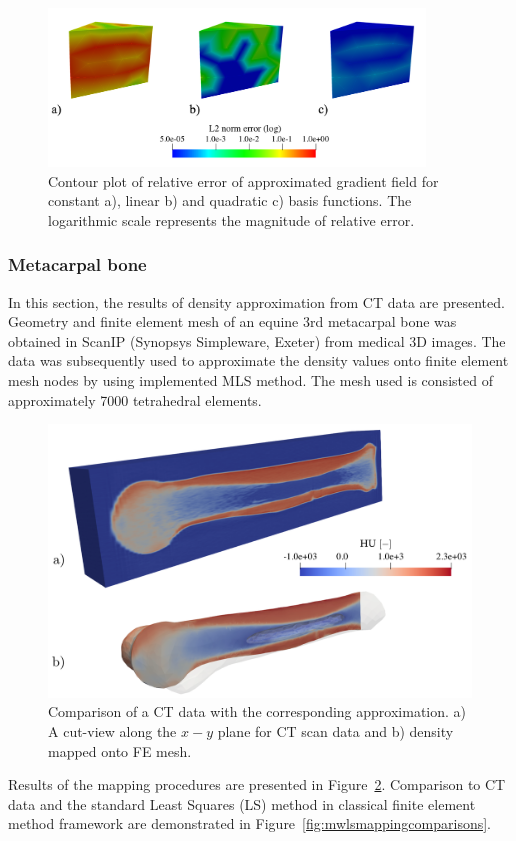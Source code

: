 \documentclass[11pt]{acmeArticle}
\numberwithin{equation}{section}
\begin{document}
\begin{figure}[h!]
	\centering
	\includegraphics[width=10cm]{Figures/prism_error.png}
	\caption{Contour plot of relative error of approximated gradient field for constant a), linear b) and quadratic c) basis functions. The logarithmic scale represents the magnitude of relative error.}
	\label{fig:prism_error}
\end{figure}
\subsubsection{Metacarpal bone}
In this section, the results of density approximation from CT data are presented. Geometry and finite element mesh of an equine 3rd metacarpal bone was obtained in ScanIP (Synopsys Simpleware, Exeter) from medical 3D images. The data was subsequently used to approximate the density values onto finite element mesh nodes by using implemented MLS method. 
The mesh used is consisted of approximately 7000 tetrahedral elements.
\begin{figure}
	\centering
	\includegraphics[width=0.5\linewidth]{Figures/mwlsmapping_cross.png}
	\caption{Comparison of a CT data with the corresponding approximation. a) A cut-view along the $x-y$ plane for CT scan data and b) density mapped onto FE mesh.}
	\label{fig:mwlsmapping_cross}
\end{figure}
Results of the mapping procedures are presented in Figure~\ref{fig:mwlsmapping_cross}. Comparison to CT data and the standard Least Squares (LS) method in classical finite element method framework are demonstrated in Figure~\ref{fig:mwlsmappingcomparisons}.
\end{document}
